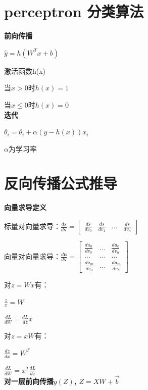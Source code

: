 \documentclass[UTF8]{ctexart}
\begin{document}
\section{perceptron 分类算法}
\noindent \textbf{前向传播}

  $\hat{y} = h(W^Tx + b)$
  
  激活函数h(x)

  \quad 当$x > 0$时$h(x) = 1$

  \quad 当$x \leq 0$时$h(x) = 0$\\
\textbf{迭代}

  $\theta_i = \theta_i + \alpha(y - h(x))x_i$
  
  \quad $\alpha$为学习率

\section{反向传播公式推导}
\noindent \textbf{向量求导定义}

  标量对向量求导：$\frac{ds}{d\textbf{v}} = \begin{bmatrix}
    \frac{ds}{dv_0} & \frac{ds}{dv_1} & ... & \frac{ds}{dv_n}
    \end{bmatrix}$

  向量对向量求导：$\frac{d\textbf{u}}{d\textbf{v}} = \begin{bmatrix}
    \frac{du_0}{dv_0} & ... & \frac{du_0}{dv_n} \\
    ... & ... & ... \\
    \frac{du_m}{dv_0} & ... & \frac{du_m}{dv_n}
    \end{bmatrix}$
  
  对$z = Wx$有：
  
  \quad $\frac{z}{x} = W$
  
  \quad $\frac{dL}{dW} = \frac{dL}{dz}x$

  对$z = xW$有：
  
  \quad $\frac{dz}{dx} = W^T$

  \quad $\frac{dL}{dW} = x^T\frac{dL}{dz}$\\
\textbf{对一层前向传播$g(Z)$, $Z = XW + \vec{b}$}
\end{document}
